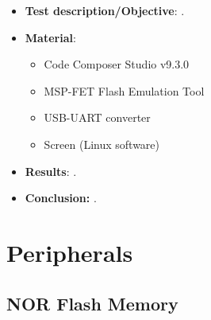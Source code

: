 \begin{itemize}
    \item \textbf{Test description/Objective}: .
    \item \textbf{Material}:
        \begin{itemize}
            \item Code Composer Studio v9.3.0
            \item MSP-FET Flash Emulation Tool
            \item USB-UART converter
            \item Screen (Linux software)
        \end{itemize}
    \item \textbf{Results}: .
    \item \textbf{Conclusion:} .
\end{itemize}

%


\section{Peripherals}

\subsection{NOR Flash Memory}

